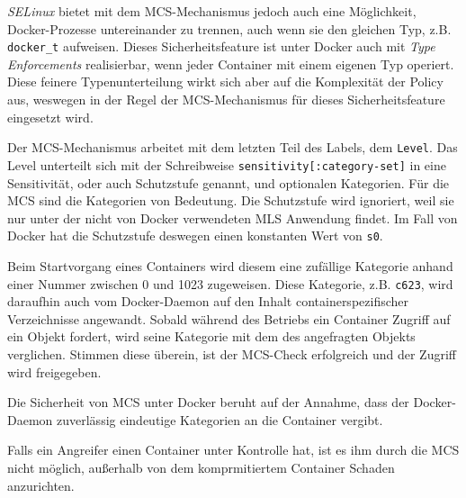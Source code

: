 \documentclass[../main.tex]{subfiles}
\begin{document}
					\emph{SELinux} bietet mit dem MCS-Mechanismus jedoch auch eine Möglichkeit, Docker-Prozesse untereinander zu trennen, auch wenn sie den gleichen Typ, z.B. \texttt{docker\_t} aufweisen. Dieses Sicherheitsfeature ist unter Docker auch mit \emph{Type Enforcements} realisierbar, wenn jeder Container mit einem eigenen Typ operiert. Diese feinere Typenunterteilung wirkt sich aber auf die Komplexität der Policy aus, weswegen in der Regel der MCS-Mechanismus für dieses Sicherheitsfeature eingesetzt wird.

					Der MCS-Mechanismus arbeitet mit dem letzten Teil des Labels, dem \texttt{Level}. Das Level unterteilt sich mit der Schreibweise \texttt{sensitivity[:category-set]} in eine Sensitivität, oder auch Schutzstufe genannt, und optionalen Kategorien. Für die MCS sind die Kategorien von Bedeutung. Die Schutzstufe wird ignoriert, weil sie nur unter der nicht von Docker verwendeten \acrshort{MLS} Anwendung findet. Im Fall von Docker hat die Schutzstufe deswegen einen konstanten Wert von \texttt{s0}.

					Beim Startvorgang eines Containers wird diesem eine zufällige Kategorie anhand einer Nummer zwischen 0 und 1023 zugeweisen. Diese Kategorie, z.B. \texttt{c623}, wird daraufhin auch vom Docker-Daemon auf den Inhalt containerspezifischer Verzeichnisse angewandt. Sobald während des Betriebs ein Container Zugriff auf ein Objekt fordert, wird seine Kategorie mit dem des angefragten Objekts verglichen. Stimmen diese überein, ist der MCS-Check erfolgreich und der Zugriff wird freigegeben.

					Die Sicherheit von MCS unter Docker beruht auf der Annahme, dass der Docker-Daemon zuverlässig eindeutige Kategorien an die Container vergibt.

					Falls ein Angreifer einen Container unter Kontrolle hat, ist es ihm durch die MCS nicht möglich, außerhalb von dem komprmitiertem Container Schaden anzurichten.
\end{document}
